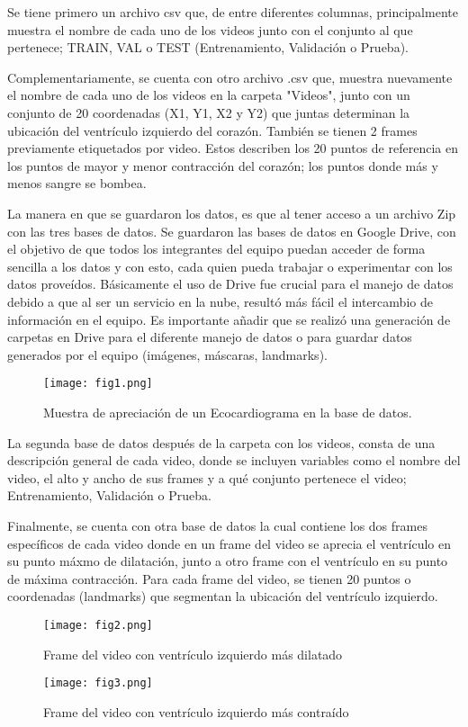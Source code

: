 \documentclass[runningheads]{llncs}
\begin{document}
Se tiene primero un archivo csv que, de entre diferentes columnas, principalmente muestra el nombre de cada uno de los videos junto con el conjunto al que pertenece; TRAIN, VAL o TEST (Entrenamiento, Validación o Prueba).

Complementariamente, se cuenta con otro archivo .csv que, muestra nuevamente el nombre de cada uno de los videos en la carpeta "Videos", junto con un conjunto de 20 coordenadas (X1, Y1, X2 y Y2) que juntas determinan la ubicación del ventrículo izquierdo del corazón. También se tienen 2 frames previamente etiquetados por video. Estos describen los 20 puntos de referencia en los puntos de mayor y menor contracción del corazón; los puntos donde más y menos sangre se bombea.

La manera en que se guardaron los datos, es que al tener acceso a un archivo Zip con las tres bases de datos. Se guardaron las bases de datos en Google Drive, con el objetivo de que todos los integrantes del equipo puedan acceder de forma sencilla a los datos y con esto, cada quien pueda trabajar o experimentar con los datos proveídos. Básicamente el uso de Drive fue crucial para el manejo de datos debido a que al ser un servicio en la nube, resultó más fácil el intercambio de información en el equipo. Es importante añadir que se realizó una generación de carpetas en Drive para el diferente manejo de datos o para guardar datos generados por el equipo (imágenes, máscaras, landmarks). 

\begin{figure} [H]
    \centering
    \texttt{[image: fig1.png]}
    \caption{Muestra de apreciación de un Ecocardiograma en la base de datos.}
    \label{fig:fig1}
\end{figure}

La segunda base de datos después de la carpeta con los videos, consta de una descripción general de cada video, donde se incluyen variables como el nombre del video, el alto y ancho de sus frames y a qué conjunto pertenece el video; Entrenamiento, Validación o Prueba.

Finalmente, se cuenta con otra base de datos la cual contiene los dos frames específicos de cada video donde en un frame del video se aprecia el ventrículo en su punto máxmo de dilatación,  junto a otro frame con el ventrículo en su punto de máxima contracción. Para cada frame del video, se tienen 20 puntos o coordenadas (landmarks) que segmentan la ubicación del ventrículo izquierdo.

\begin{figure} [H]
    \centering
    \texttt{[image: fig2.png]}
    \caption{Frame del video con ventrículo izquierdo más dilatado}
    \label{fig:fig2}
\end{figure}
\begin{figure} [H]
    \centering
    \texttt{[image: fig3.png]}
    \caption{Frame del video con ventrículo  izquierdo más contraído}
    \label{fig:fig3}
\end{figure}
\end{document}
